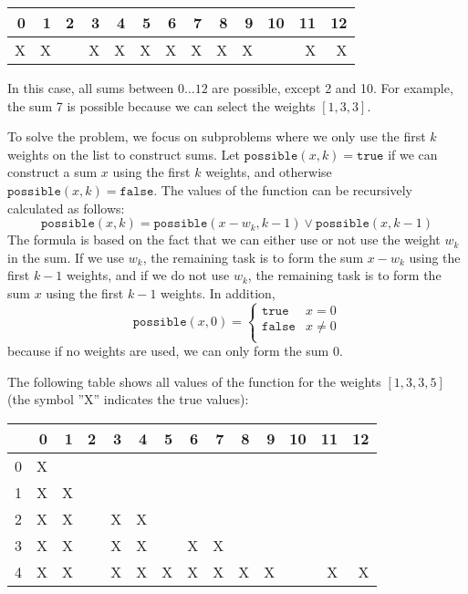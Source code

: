 \begin{center}
\begin{tabular}{rrrrrrrrrrrrr}
 0 & 1 & 2 & 3 & 4 & 5 & 6 & 7 & 8 & 9 & 10 & 11 & 12 \\
\hline
 X & X & & X & X & X & X & X & X & X & & X & X \\
\end{tabular}
\end{center}

In this case, all sums between $0 \ldots 12$
are possible, except 2 and 10.
For example, the sum 7 is possible because we
can select the weights $[1,3,3]$.

To solve the problem, we focus on subproblems
where we only use the first $k$ weights
on the list to construct sums.
Let $\texttt{possible}(x,k)=\texttt{true}$ if
we can construct a sum $x$
using the first $k$ weights,
and otherwise $\texttt{possible}(x,k)=\texttt{false}$.
The values of the function can be recursively
calculated as follows:
\[ \texttt{possible}(x,k) = \texttt{possible}(x-w_k,k-1) \lor \texttt{possible}(x,k-1) \]
The formula is based on the fact that we can
either use or not use the weight $w_k$ in the sum.
If we use $w_k$, the remaining task is to
form the sum $x-w_k$ using the first $k-1$ weights,
and if we do not use $w_k$,
the remaining task is to form the sum $x$
using the first $k-1$ weights.
In addition,
\begin{equation*}
    \texttt{possible}(x,0) = \begin{cases}
               \texttt{true}    & x = 0\\
               \texttt{false}   & x \neq 0 \\
           \end{cases}
\end{equation*}
because if no weights are used,
we can only form the sum 0.

The following table shows all values of the function
for the weights $[1,3,3,5]$ (the symbol ''X''
indicates the true values):

\begin{center}
\begin{tabular}{r|rrrrrrrrrrrrr}
 & 0 & 1 & 2 & 3 & 4 & 5 & 6 & 7 & 8 & 9 & 10 & 11 & 12 \\
\hline
 0 & X & \\
 1 & X & X \\
 2 & X & X & & X & X \\
 3 & X & X & & X & X & & X & X \\
 4 & X & X & & X & X & X & X & X & X & X & & X & X \\
\end{tabular}
\end{center}

